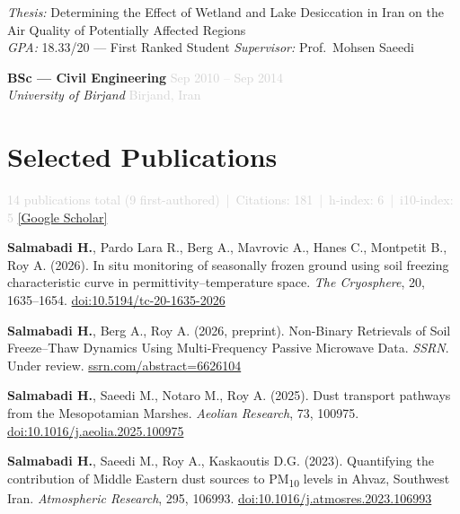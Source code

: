 \documentclass[10pt, a4paper]{article}
\newcommand{\dategray}[1]{\textcolor{lightgray}{\small #1}}
\newcommand{\jobtitle}[4]{%
  \noindent\textbf{#1} \hfill \dategray{#3} \\
  \textit{#2} \hfill \dategray{#4} \\[-4pt]
}
\newcommand{\publication}[1]{\noindent #1 \vspace{3pt}}
\begin{document}
\noindent\textit{Thesis:} Determining the Effect of Wetland and Lake
Desiccation in Iran on the Air Quality of Potentially Affected Regions\\
\textit{GPA:} 18.33/20 — First Ranked Student \quad
\textit{Supervisor:} Prof.\ Mohsen Saeedi

\vspace{6pt}

\jobtitle{BSc — Civil Engineering}
         {University of Birjand}
         {Sep 2010 – Sep 2014}
         {Birjand, Iran}

\section{Selected Publications}

\noindent\textcolor{lightgray}{\small
  14 publications total (9 first-authored) \,|\,
  Citations: 181 \,|\, h-index: 6 \,|\, i10-index: 5 \quad
  \href{https://scholar.google.com/citations?user=QAvXX3cAAAAJ}{[Google Scholar]}
}

\vspace{4pt}


\publication{\textbf{Salmabadi H.}, Pardo Lara R., Berg A., Mavrovic A., Hanes C., Montpetit B., Roy A. (2026).
In situ monitoring of seasonally frozen ground using soil freezing characteristic curve in permittivity–temperature space.
\textit{The Cryosphere}, 20, 1635–1654.
\href{https://doi.org/10.5194/tc-20-1635-2026}{doi:10.5194/tc-20-1635-2026}}

\publication{\textbf{Salmabadi H.}, Berg A., Roy A. (2026, preprint).
Non-Binary Retrievals of Soil Freeze–Thaw Dynamics Using Multi-Frequency Passive Microwave Data.
\textit{SSRN}. Under review.
\href{https://ssrn.com/abstract=6626104}{ssrn.com/abstract=6626104}}

\publication{\textbf{Salmabadi H.}, Saeedi M., Notaro M., Roy A. (2025).
Dust transport pathways from the Mesopotamian Marshes.
\textit{Aeolian Research}, 73, 100975.
\href{https://doi.org/10.1016/j.aeolia.2025.100975}{doi:10.1016/j.aeolia.2025.100975}}

\publication{\textbf{Salmabadi H.}, Saeedi M., Roy A., Kaskaoutis D.G. (2023).
Quantifying the contribution of Middle Eastern dust sources to PM\textsubscript{10}
levels in Ahvaz, Southwest Iran.
\textit{Atmospheric Research}, 295, 106993.
\href{https://doi.org/10.1016/j.atmosres.2023.106993}{doi:10.1016/j.atmosres.2023.106993}}
\end{document}
